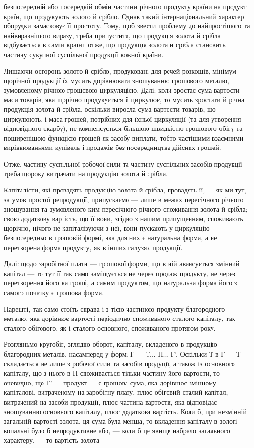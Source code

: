 безпосередній або посередній обмін частини річного продукту країни на
продукт країн, що продукують золото й срібло. Однак такий інтернаціональний
характер оборудки замасковує її простоту. Тому, щоб звести
проблему до найпростішого та найвиразнішого виразу, треба припустити,
що продукція золота й срібла відбувається в самій країні, отже, що продукція
золота й срібла становить частину сукупної суспільної продукції
кожної країни.

Лишаючи осторонь золото й срібло, продуковані для речей розкошів,
мінімум щорічної продукції їх мусить дорівнювати зношуванню грошового
металю, зумовленому річною грошовою циркуляцією. Далі: коли
зростає сума вартости маси товарів, яка щорічно продукується й циркулює,
то мусить зростати й річна продукція золота й срібла, оскільки
виросла сума вартости товарів, що циркулюють, і маса грошей, потрібних
для їхньої циркуляції (та для утворення відповідного скарбу), не компенсується
більшою швидкістю грошового обігу та поширенішою функцією
грошей як засобу виплати, тобто частішими взаємними вирівнюваннями
купівель і продажів без посередництва дійсних грошей.

Отже, частину суспільної робочої сили та частину суспільних засобів
продукції треба щороку витрачати на продукцію золота й срібла.

Капіталісти, які провадять продукцію золота й срібла, провадять її, —
як ми тут, за умов простої репродукції, припускаємо — лише в межах
пересічного річного зношування та зумовленого ким пересічного річного
споживання золота й срібла; свою додаткову вартість, що її вони, згідно
з нашим припущенням, споживають щорічно, нічого не капіталізуючи з
неї, вони пускають у циркуляцію безпосередньо в грошовій формі, яка
для них є натуральна форма, а не перетворена форма продукту, як в інших
галузях продукції.

Далі: щодо заробітної плати — грошової форми, що в ній авансується
змінний капітал — то тут її так само заміщується не через продаж
продукту, не через перетворення його на гроші, а самим продуктом, що
натуральна форма його з самого початку є грошова форма.

Нарешті, так само стоїть справа і з тією частиною продукту благородного
металю, яка дорівнює вартості періодично споживаного сталого
капіталу, так сталого обігового, як і сталого основного, споживаного протягом
року.

Розгляньмо кругобіг, зглядно оборот, капіталу, вкладеного в продукцію
благородних металів, насамперед у формі Г — Т... П... Г'. Оскільки
Т в Г — Т складається не лише з робочої сили та засобів продуції, а також
із основного капіталу, що з нього в П споживається тільки частину
його вартости, то очевидно, що Г' — продукт — є грошова сума, яка
дорівнює змінному капіталові, витраченому на заробітну плату, плюс обіговий
сталий капітал, витрачений на засоби продукції, плюс частина
вартости, яка відповідає зношуванню основного капіталу, плюс додаткова
вартість. Коли б, при незмінній загальній вартості золота, ця сума була
менша, то вкладення капіталу в золоті копальні було б непродуктивне
або, — коли б це явище набрало загального характеру, — то вартість золота
